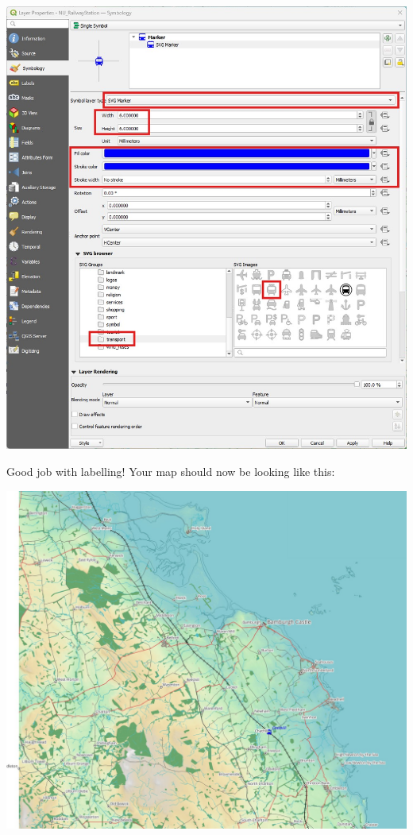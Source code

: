 \documentclass[
  letterpaper,
  DIV=11,
  numbers=noendperiod]{scrreprt}
\begin{document}
\includegraphics{images/lab_8/lab8_fig8_train_symbol.jpg}

Good job with labelling! Your map should now be looking like this:

\includegraphics{images/lab_8/lab8_fig7_map_with_labels.jpg}
\end{document}

